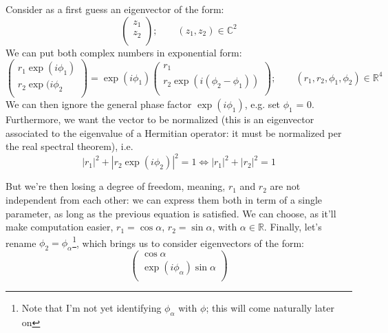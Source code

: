 \documentclass[solutions.tex]{subfiles}
\begin{document}
Consider as a first guess an eigenvector of the form:
\[
	\begin{pmatrix}
		z_1 \\
		z_2 \\
	\end{pmatrix};\qquad (z_1, z_2)\in\mathbb{C}^2
\]
We can put both complex numbers in exponential form:
\[
	\begin{pmatrix}
		r_1\exp(i\phi_1) \\
		r_2\exp(i\phi_2 \\
	\end{pmatrix} = \exp(i\phi_1)\begin{pmatrix}
		r_1 \\
		r_2\exp(i(\phi_2-\phi_1)) \\
	\end{pmatrix};\qquad (r_1, r_2, \phi_1, \phi_2)\in\mathbb{R}^4
\]
We can then ignore the general phase factor $\exp(i\phi_1)$, e.g.
set $\phi_1$ = 0. Furthermore, we want the vector to be normalized
(this is an eigenvector associated to the eigenvalue of a Hermitian
operator: it must be normalized per the real spectral theorem), i.e.
\[
	|r_1|^2 + |r_2\exp(i\phi_2)|^2 = 1
	\Leftrightarrow |r_1|^2 + |r_2|^2 = 1
\]

But we're then losing a degree of freedom, meaning, $r_1$ and $r_2$
are not independent from each other: we can express them both in term of
a single parameter, as long as the previous equation is satisfied.
We can choose, as it'll make computation easier,
$r_1 = \cos\alpha$, $r_2=\sin\alpha$, with $\alpha\in\mathbb{R}$.
Finally, let's rename $\phi_2=\phi_\alpha$\footnote{Note that I'm not
yet identifying $\phi_\alpha$ with $\phi$; this will come naturally
later on}, which brings us to consider eigenvectors of the form:
\[
	\begin{pmatrix}
		\cos\alpha \\
		\exp(i\phi_\alpha)\sin\alpha \\
	\end{pmatrix}
\]
\end{document}
